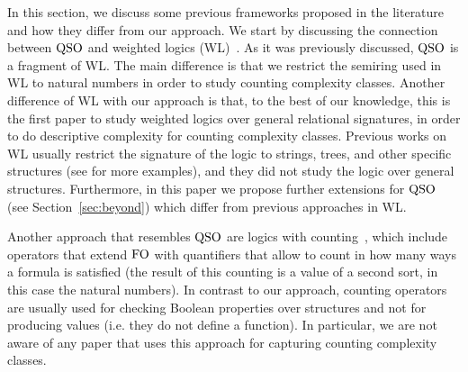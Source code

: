 In this section, we discuss some previous frameworks proposed in the literature and how they differ from our approach.
We start by discussing the connection between ${\rm QSO}$ and weighted logics (WL)~\cite{DrosteG07}. 
As it was previously discussed, ${\rm QSO}$ is a fragment of WL.
The main difference is that we restrict the semiring used in WL to natural numbers in order to study counting complexity classes.
Another difference of WL with our approach is that, to the best of our knowledge, this is the first paper to study weighted logics over general relational signatures, in order  to do descriptive complexity for counting complexity classes. 
Previous works on WL usually restrict the signature of the logic to strings, trees, and other specific structures (see \cite{droste2009handbook} for more examples), and they did not study the logic over general structures. 
Furthermore, in this paper we propose further extensions for ${\rm QSO}$ (see Section~\ref{sec:beyond}) which differ from previous approaches in WL.

Another approach that resembles ${\rm QSO}$ are logics with counting~\cite{IL90,E97,GG98,L04}, which include operators that extend ${\rm FO}$ with quantifiers that allow to count in how many ways a formula  is satisfied (the result of this counting is a value of a second sort, in this case the  natural numbers). 
In contrast to our approach, counting operators are usually used for checking Boolean properties over structures and not for producing values (i.e. they do not define a function).
In particular, we are not aware of any paper that uses this approach for capturing counting complexity classes.



